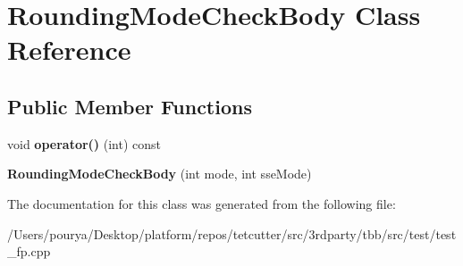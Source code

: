 \hypertarget{classRoundingModeCheckBody}{}\section{Rounding\+Mode\+Check\+Body Class Reference}
\label{classRoundingModeCheckBody}
\subsection*{Public Member Functions}
\begin{DoxyCompactItemize}
\item 
\hypertarget{classRoundingModeCheckBody_ac9852b830054b52ee874cbb583e78050}{}void {\bfseries operator()} (int) const \label{classRoundingModeCheckBody_ac9852b830054b52ee874cbb583e78050}

\item 
\hypertarget{classRoundingModeCheckBody_ae074cf57f97ae83b40b95f54b5bf5fe9}{}{\bfseries Rounding\+Mode\+Check\+Body} (int mode, int sse\+Mode)\label{classRoundingModeCheckBody_ae074cf57f97ae83b40b95f54b5bf5fe9}

\end{DoxyCompactItemize}


The documentation for this class was generated from the following file\+:\begin{DoxyCompactItemize}
\item 
/\+Users/pourya/\+Desktop/platform/repos/tetcutter/src/3rdparty/tbb/src/test/test\+\_\+fp.\+cpp\end{DoxyCompactItemize}
